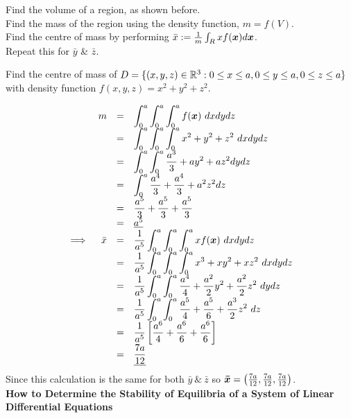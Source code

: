 \documentclass[11pt,a4paper]{article}
\begin{document}
\subtitle{Process}
Find the volume of a region, as shown before.\\
Find the mass of the region using the density function, $m = f(V)$.\\
Find the centre of mass by performing $\bar{x} := \frac{1}{m}\int_R xf(\boldsymbol{x}) d\boldsymbol{x}$.\\
Repeat this for $\bar{y}$ \& $\bar{z}$.\\

\subtitle{Example}
Find the centre of mass of $D = \{(x, y , z) \in \mathbb{R}^3 : 0 \leq x \leq a, 0 \leq y \leq a, 0 \leq z \leq a\}$ with density function $f(x,y,z) = x^2 + y^2 + z^2$.

\[\begin{array}{rrcl}
&m&=& \displaystyle{\int_0^a \int_0^a \int_0^a f(\vect{x})}\ dxdydz\\
&&=& \displaystyle{\int_0^a \int_0^a \int_0^a x^2 + y^2 + z^2}\ dxdydz\\
&&=& \displaystyle{\int_0^a \int_0^a \frac{a^3}{3} + ay^2 + az^2 dy} dz\\
&&=& \displaystyle{\int_0^a \frac{a^4}{3} + \frac{a^4}{3} +a^2z^2} dz\\
&&=& \displaystyle{\frac{a^5}{3} + \frac{a^5}{3} + \frac{a^5}{3}}\\
&&=& \underline{a^5}\\
\implies&\bar{x} &=& \displaystyle{\frac{1}{a^5} \int_0^a \int_0^a \int_0^a xf(\vect{x})}\ dxdydz\\
&&=& \displaystyle{\frac{1}{a^5} \int_0^a \int_0^a \int_0^a x^3 +xy^2 + xz^2}\ dxdydz\\
&&=& \displaystyle{\frac{1}{a^5} \int_0^a \int_0^a \frac{a^4}{4} +\frac{a^2}{2}y^2 + \frac{a^2}{2}z^2}\ dydz\\
&&=& \displaystyle{\frac{1}{a^5} \int_0^a \int_0^a \frac{a^5}{4} +\frac{a^5}{6} + \frac{a^3}{2}z^2}\ dz\\
&&=& \displaystyle{\frac{1}{a^5} \left[\frac{a^6}{4} + \frac{a^6}{6} + \frac{a^6}{6}\right]}\\
&&=& \displaystyle{\underline{\frac{7a}{12}}}
\end{array}\]
Since this calculation is the same for both $\bar{y}\ \&\ \bar{z}$ so $\boldsymbol{\bar{x}} = \left(\frac{7a}{12}, \frac{7a}{12}, \frac{7a}{12} \right)$.\\

\textbf{How to Determine the Stability of Equilibria of a System of Linear Differential Equations}\\
\end{document}
